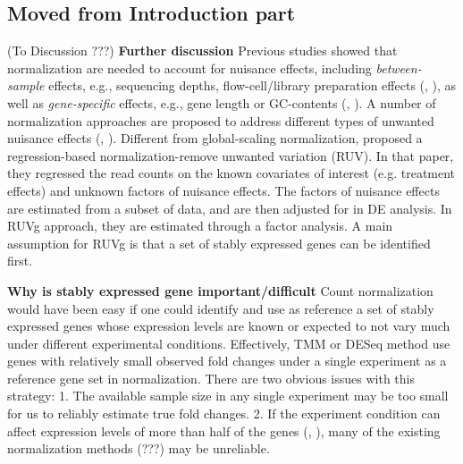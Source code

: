 \documentclass[11pt, a4paper]{article}
\begin{document}



\subsection{Moved from Introduction part}



(To Discussion ???) {\bf Further discussion} Previous studies showed that
normalization are needed to account for nuisance effects, including
\textit{between-sample} effects, e.g., sequencing depths, flow-cell/library
preparation effects (\cite{bullard2010evaluation},
\cite{robinson2010scaling}), as well as \textit{gene-specific} effects, e.g.,
gene length or GC-contents (\cite{risso2011gc}, \cite{hansen2012removing}). A
number of normalization approaches are proposed to address different types of
unwanted nuisance effects (\cite{dillies2013comprehensive},
\cite{risso2014nat}). Different from global-scaling normalization,
\cite{risso2014nat}  proposed a regression-based normalization-remove unwanted
variation (RUV).  In that paper, they regressed the read counts on the known
covariates of interest (e.g. treatment effects) and unknown factors of
nuisance effects. The factors of nuisance effects are estimated from a subset
of data, and are then adjusted for in DE analysis. In RUVg approach, they are
estimated through a factor analysis. A main assumption for RUVg is that a set
of stably expressed genes can be identified first.


\textbf{Why is stably expressed gene important/difficult} Count normalization would have been easy if one could identify and use as reference a set of stably expressed genes whose expression levels are known or expected to not vary much under different experimental conditions.  Effectively, TMM or DESeq method use genes with relatively small observed fold changes under a single experiment as a reference gene set in normalization. There are two obvious issues with this strategy: 1. The available sample size in any single experiment may be too small for us to reliably estimate true fold changes. 2. If the experiment condition can affect expression levels of more than half of the genes (\cite{loven2012revisiting}, \cite{wu2013use}), many of the existing normalization methods (???) may be unreliable.  
\end{document}
